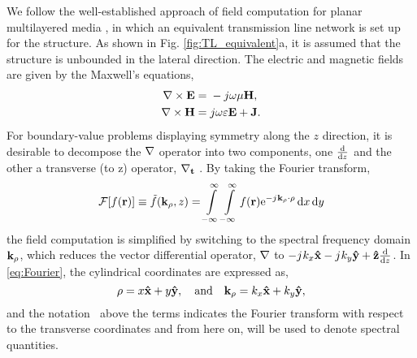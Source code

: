\documentclass[11pt]{article}
\begin{document}
We follow the well-established approach of field computation for planar multilayered media \cite{michalski1997multilayered, michalski2005}, in which an equivalent transmission line network is set up for the structure. As shown in Fig. \ref{fig:TL_equivalent}a, it is assumed that the structure is unbounded in the lateral direction. The electric and magnetic fields are given by the Maxwell's equations,
\begin{subequations}
  \begin{align}
    \nabla\times{\mathbf{E}} ={}& -j \omega \mu \mathbf{H},
    \label{eq:E}\\
    \nabla\times{\mathbf{H}} ={}& j \omega \varepsilon \mathbf{E} + \mathbf{J}.
    \label{eq:H}
  \end{align}
  \label{eq:MaxE}%
\end{subequations}
%
For boundary-value problems displaying symmetry along the $z$ direction, it is desirable to decompose the $\mathbf{\nabla}$ operator into two components, one $\dv{}{z}$ and the other a transverse (to z) operator, $\mathbf{\nabla_t}$ \cite[p. 64]{felsen1994}. By taking the Fourier transform,
%
\begin{equation}
    \mathcal{F}[f(\mathbf{r})] \equiv \tilde{f}(\mathbf{k_{\rho}},z) = \int\limits_{-\infty}^\infty \int\limits_{-\infty}^\infty
    f(\mathbf{r}) \mathrm{e}^{-j\mkern1mu \mathbf{k_{\rho}} \cdot \mathbf{\rho}} \mathop{}\!\mathrm{d}{x} \mathop{}\!\mathrm{d}{y}
    \label{eq:Fourier}
\end{equation}
%
the field computation is simplified by switching to the spectral frequency domain $\mathbf{k_{\rho}}$, which reduces the vector differential operator, $\mathbf{\nabla}$ to $-j\mkern1mu k_x \mathbf{\hat{x}} - j\mkern1mu k_y \mathbf{\hat{y}} + \mathbf{\hat{z}}\dv{}{z}$. In \eqref{eq:Fourier}, the cylindrical coordinates are expressed as,
%
\begin{equation}
  \mathbf{\rho} = x\mathbf{\hat{x}} + y\mathbf{\hat{y}}, \quad \text{and} \quad
  \mathbf{k_{\rho}} = k_x\mathbf{\hat{x}} + k_y\mathbf{\hat{y}},
\end{equation}
%
and the notation $~$ above the terms indicates the Fourier transform with respect to the transverse coordinates and from here on, will be used to denote spectral quantities.
\end{document}
